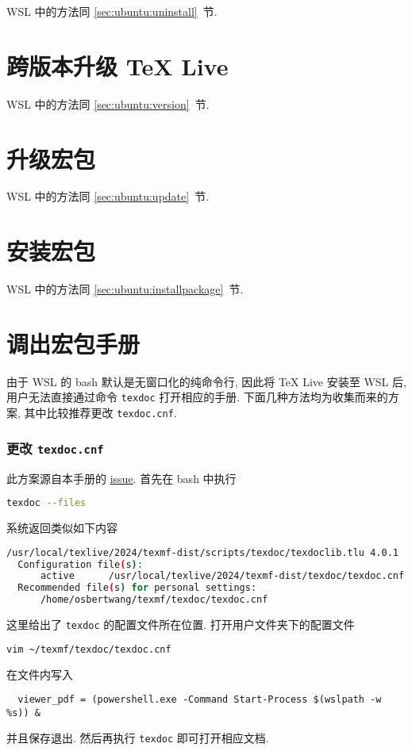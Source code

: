 WSL 中的方法同 \ref{sec:ubuntu:uninstall}~节.

\section{跨版本升级 \TeX{} Live}

WSL 中的方法同 \ref{sec:ubuntu:version}~节.

\section{升级宏包}

WSL 中的方法同 \ref{sec:ubuntu:update}~节.

\section{安装宏包}

WSL 中的方法同 \ref{sec:ubuntu:installpackage}~节.

\section{调出宏包手册}

由于 WSL 的 \textsf{bash} 默认是无窗口化的纯命令行,
因此将 \TeX{} Live 安装至 WSL 后,
用户无法直接通过命令 \texttt{texdoc} 打开相应的手册.
下面几种方法均为收集而来的方案,
其中比较推荐更改 \texttt{texdoc.cnf}.

\subsubsection{更改 \texttt{texdoc.cnf}}

此方案源自本手册的 \href{https://github.com/OsbertWang/install-latex-guide-zh-cn/issues/13}{issue}.
首先在 \textsf{bash} 中执行
\begin{lstlisting}[language=bash]
  texdoc --files
\end{lstlisting}
系统返回类似如下内容
\begin{lstlisting}[language=bash]
  /usr/local/texlive/2024/texmf-dist/scripts/texdoc/texdoclib.tlu 4.0.1
  Configuration file(s):
      active      /usr/local/texlive/2024/texmf-dist/texdoc/texdoc.cnf
  Recommended file(s) for personal settings:
      /home/osbertwang/texmf/texdoc/texdoc.cnf
\end{lstlisting}
这里给出了 \texttt{texdoc} 的配置文件所在位置.
打开用户文件夹下的配置文件
\begin{lstlisting}[language=bash]
  vim ~/texmf/texdoc/texdoc.cnf
\end{lstlisting}
在文件内写入
\begin{lstlisting}
  viewer_pdf = (powershell.exe -Command Start-Process $(wslpath -w %s)) &
\end{lstlisting}
并且保存退出.
然后再执行 \texttt{texdoc} 即可打开相应文档.

